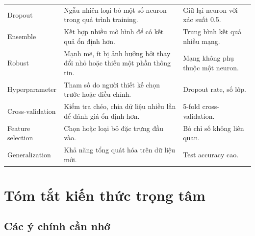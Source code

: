 \documentclass[12pt,a4paper]{report}
\begin{document}
\begin{longtable}{p{}p{}p{}}
Dropout & Ngẫu nhiên loại bỏ một số neuron trong quá trình training. & Giữ lại neuron với xác suất 0.5. \\

Ensemble & Kết hợp nhiều mô hình để có kết quả ổn định hơn. & Trung bình kết quả nhiều mạng. \\

Robust & Mạnh mẽ, ít bị ảnh hưởng bởi thay đổi nhỏ hoặc thiếu một phần thông tin. & Mạng không phụ thuộc một neuron. \\

Hyperparameter & Tham số do người thiết kế chọn trước hoặc điều chỉnh. & Dropout rate, số lớp. \\

Cross-validation & Kiểm tra chéo, chia dữ liệu nhiều lần để đánh giá ổn định hơn. & 5-fold cross-validation. \\

Feature selection & Chọn hoặc loại bỏ đặc trưng đầu vào. & Bỏ chỉ số không liên quan. \\

Generalization & Khả năng tổng quát hóa trên dữ liệu mới. & Test accuracy cao. \\

\bottomrule
\end{longtable}
\normalsize

\chapter{Tóm tắt kiến thức trọng tâm}

\section{Các ý chính cần nhớ}
\end{document}
